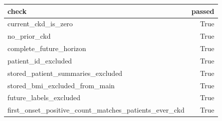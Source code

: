 \begin{tabular}{lr}
\toprule
check & passed \\
\midrule
current\_ckd\_is\_zero & True \\
no\_prior\_ckd & True \\
complete\_future\_horizon & True \\
patient\_id\_excluded & True \\
stored\_patient\_summaries\_excluded & True \\
stored\_bmi\_excluded\_from\_main & True \\
future\_labels\_excluded & True \\
first\_onset\_positive\_count\_matches\_patients\_ever\_ckd & True \\
\bottomrule
\end{tabular}
